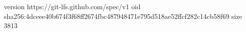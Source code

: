 version https://git-lfs.github.com/spec/v1
oid sha256:4dceee40b674f3f68ff2674fbc487948471e795d518ae52ffcf282c14cb58f69
size 3813
